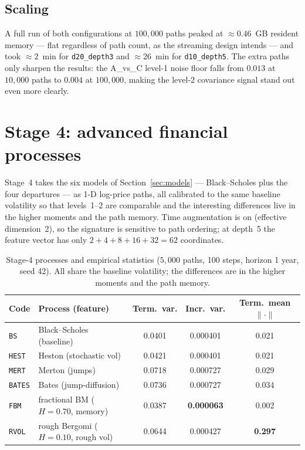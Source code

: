 \documentclass[11pt]{article}
\newcommand{\code}[1]{\texttt{#1}}
\begin{document}
\subsection{Scaling}
A full run of both configurations at $100{,}000$ paths peaked at
$\approx 0.46$~GB resident memory --- flat regardless of path count, as the
streaming design intends --- and took $\approx 2$~min for \code{d20\_depth3} and
$\approx 26$~min for \code{d10\_depth5}. The extra paths only sharpen the results:
the A\_vs\_C level-1 noise floor falls from $0.013$ at $10{,}000$ paths to $0.004$
at $100{,}000$, making the level-2 covariance signal stand out even more clearly.

\section{Stage 4: advanced financial processes}
Stage~4 takes the six models of Section~\ref{sec:models} --- Black--Scholes plus
the four departures --- as 1-D log-price paths, all calibrated to the same baseline
volatility so that levels~1--2 are comparable and the interesting differences live
in the higher moments and the path memory. Time augmentation is on (effective
dimension~2), so the signature is sensitive to path ordering; at depth~5 the
feature vector has only $2+4+8+16+32=62$ coordinates.

\begin{table}[H]
\centering
\caption{Stage-4 processes and empirical statistics ($5{,}000$ paths, 100 steps,
horizon 1 year, seed 42). All share the baseline volatility; the differences are in
the higher moments and the path memory.}
\renewcommand{\arraystretch}{1.15}
\begin{tabular}{@{}llccc@{}}
\toprule
Code & Process (feature) & Term.\ var. & Incr.\ var. & Term.\ mean $\|\cdot\|$ \\
\midrule
\code{BS}    & Black--Scholes (baseline)        & 0.0401 & 0.000401 & 0.021 \\
\code{HEST}  & Heston (stochastic vol)          & 0.0421 & 0.000401 & 0.021 \\
\code{MERT}  & Merton (jumps)                   & 0.0718 & 0.000727 & 0.029 \\
\code{BATES} & Bates (jump-diffusion)           & 0.0736 & 0.000727 & 0.034 \\
\code{FBM}   & fractional BM ($H{=}0.70$, memory)& 0.0387 & \textbf{0.000063} & 0.002 \\
\code{RVOL}  & rough Bergomi ($H{=}0.10$, rough vol)& 0.0644 & 0.000427 & \textbf{0.297} \\
\bottomrule
\end{tabular}
\end{table}
\end{document}
